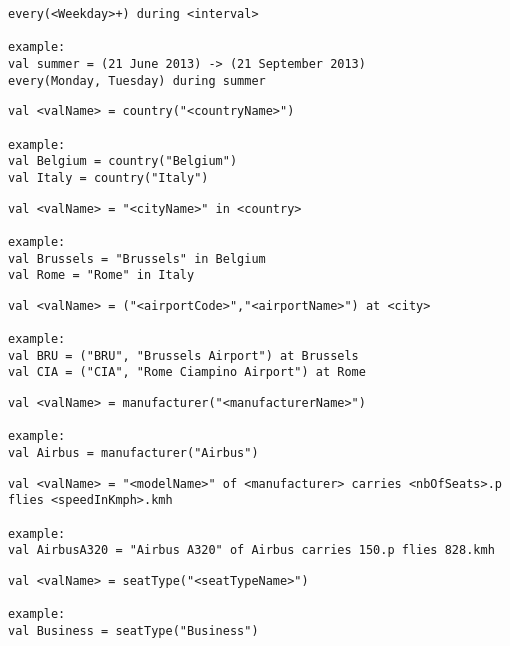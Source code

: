 \begin{lstlisting}
every(<Weekday>+) during <interval>

example:
val summer = (21 June 2013) -> (21 September 2013)
every(Monday, Tuesday) during summer
\end{lstlisting}

\begin{lstlisting}
val <valName> = country("<countryName>")

example:
val Belgium = country("Belgium")
val Italy = country("Italy")
\end{lstlisting}

\begin{lstlisting}
val <valName> = "<cityName>" in <country>

example:
val Brussels = "Brussels" in Belgium
val Rome = "Rome" in Italy
\end{lstlisting}

\begin{lstlisting}
val <valName> = ("<airportCode>","<airportName>") at <city>

example:
val BRU = ("BRU", "Brussels Airport") at Brussels
val CIA = ("CIA", "Rome Ciampino Airport") at Rome
\end{lstlisting}

\begin{lstlisting}
val <valName> = manufacturer("<manufacturerName>")

example:
val Airbus = manufacturer("Airbus")
\end{lstlisting}
\clearpage

\begin{lstlisting}
val <valName> = "<modelName>" of <manufacturer> carries <nbOfSeats>.p flies <speedInKmph>.kmh

example:
val AirbusA320 = "Airbus A320" of Airbus carries 150.p flies 828.kmh
\end{lstlisting}

\begin{lstlisting}
val <valName> = seatType("<seatTypeName>")

example:
val Business = seatType("Business")
\end{lstlisting}

